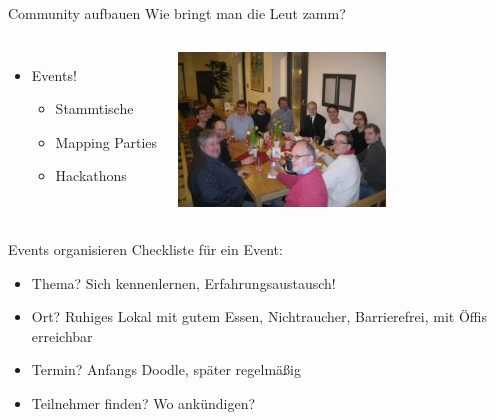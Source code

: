 \documentclass{beamer}
\begin{document}
\begin{frame}{Community aufbauen}
	Wie bringt man die Leut zamm?
	\pause

	\begin{columns}[c] 
	\begin{itemize}
		\item Events!
\vspace{4mm}
		\begin{itemize}
			  \item Stammtische
				\vspace{3mm}
			  \item Mapping Parties
				  \vspace{3mm}
			  \item Hackathons
		\end{itemize}
	\end{itemize}
	\includegraphics[width=5.5cm]{Salzburg_stammtisch.jpg}
\end{columns}

\end{frame}

\begin{frame}{Events organisieren}
	Checkliste für ein Event:
				  \vspace{3mm}
	\begin{itemize}
		\item Thema? Sich kennenlernen, Erfahrungsaustausch!
		\item Ort? Ruhiges Lokal mit gutem Essen, Nichtraucher, Barrierefrei, mit Öffis erreichbar
		\item Termin? Anfangs Doodle, später regelmäßig
		\item Teilnehmer finden? Wo ankündigen?
	\end{itemize}
\end{frame}
\end{document}
